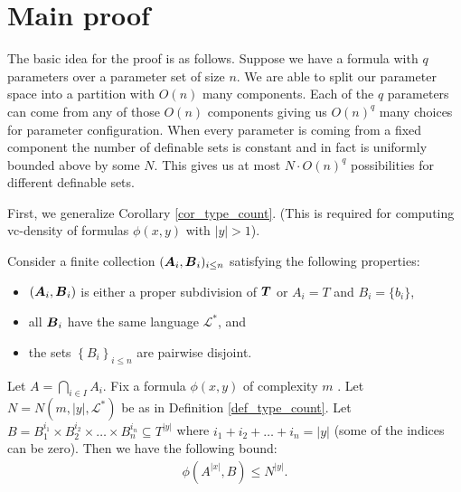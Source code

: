\documentclass{amsart}
\DeclareMathOperator{\TT}{\boldface T}
\DeclareMathOperator{\AT}{\boldface A}
\DeclareMathOperator{\BT}{\boldface B}
\renewcommand{\LL}{\mathcal L}
\newcommand{\LLU}{\LL^*}
\newcommand{\curly}[1]{\left\{#1\right\}}
\begin{document}
\section{Main proof}

The basic idea for the proof is as follows.
Suppose we have a formula with $q$ parameters over a parameter set of size $n$.
We are able to split our parameter space into a partition with $O(n)$ many components.
Each of the $q$ parameters can come from any of those $O(n)$ components giving us $O(n)^q$ many choices for parameter configuration.
When every parameter is coming from a fixed component the number of definable sets is constant and in fact is uniformly bounded above by some $N$.
This gives us at most $N \cdot O(n)^q$ possibilities for different definable sets.

First, we generalize Corollary \ref{cor_type_count}.
(This is required for computing vc-density of formulas $\phi(x, y)$ with $|y| > 1$).

\begin{Lemma} \label{lm_partition_bound}
  Consider a finite collection $(\AT_i, \BT_i)_{i \leq n}$ satisfying the following properties:
  \begin{itemize}
  \item $(\AT_i, \BT_i)$ is either a proper subdivision of $\TT$ or $A_i = T$ and $B_i = \{b_i\}$,
  \item all $\BT_i$ have the same language $\LLU$, and 
  \item the sets $\curly{B_i}_{i \leq n}$ are pairwise disjoint.
  \end{itemize}
  Let $A = \bigcap_{i \in I} A_i$.
  Fix a formula $\phi(x, y)$ of complexity $m$ . Let $N = N(m, |y|, \LLU)$ be as in Definition \ref{def_type_count}.
  Let $B = B_1^{i_1} \times B_2^{i_2} \times \ldots \times B_n^{i_n} \subseteq T^{|y|}$ where $i_1 + i_2 + \ldots + i_n = |y|$
  (some of the indices can be zero). Then we have the following bound:
  \begin{align*}
    \phi(A^{|x|}, B) \leq N^{|y|}.
  \end{align*}
\end{Lemma}
\end{document}
